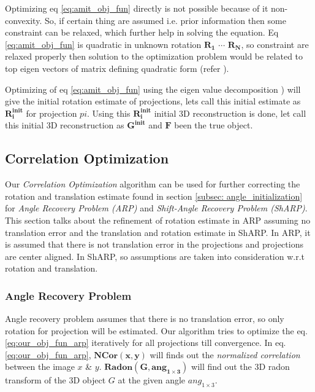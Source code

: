 \documentclass{report}
\begin{document}
Optimizing eq \ref{eq:amit_obj_fun} directly is not possible because of it non-convexity. So, if certain thing are assumed i.e. prior information then some constraint can be relaxed, which further help in solving the equation.  Eq \ref{eq:amit_obj_fun} is quadratic in unknown rotation ${\boldsymbol{R_1}}$ ${\cdots}$ ${\boldsymbol{R_N}}$, so constraint are relaxed properly then solution to the optimization problem would be related to top eigen vectors of matrix defining quadratic form (refer  \cite{singer2009threeAngleEstimate}). 

Optimizing of eq \ref{eq:amit_obj_fun} using the eigen value decomposition \cite{singer2009threeAngleEstimate}) will give the initial rotation estimate of projections, lets call this initial estimate as ${\boldsymbol{R_i^{init}}}$ for projection ${pi}$. Using this ${\boldsymbol{R_i^{init}}}$ initial 3D reconstruction is done, let call this initial 3D reconstruction as ${\boldsymbol{G^{init}}}$ and ${\boldsymbol{F}}$ been the true object.     

\subsection{Correlation Optimization}

Our \textit{Correlation Optimization} algorithm can be used for further correcting the rotation and translation estimate found in section \ref{subsec: angle_initialization} for \textit{Angle Recovery Problem (ARP)} and \textit{Shift-Angle Recovery Problem (ShARP)}.  This section talks about the refinement of rotation estimate in ARP assuming no translation error and the translation and rotation estimate in ShARP. In ARP, it is assumed that there is not translation error in the projections and projections are center aligned. In ShARP, so assumptions are taken into consideration w.r.t rotation and translation.

\subsubsection{Angle Recovery Problem}

Angle recovery problem assumes that there is no translation error, so only rotation for projection will be estimated. Our algorithm tries to optimize the eq. \ref{eq:our_obj_fun_arp} iteratively for all projections till convergence. In eq. \ref{eq:our_obj_fun_arp}, ${\boldsymbol{NCor(x,y)}}$ will finds out the \textit{normalized correlation} between the image ${x}$ \& ${y}$. ${\boldsymbol{Radon(G,ang_{1\times 3})}}$ will find out the 3D radon transform of the 3D object ${G}$ at the given angle ${ang_{1 \times 3}}$.     
\end{document}
